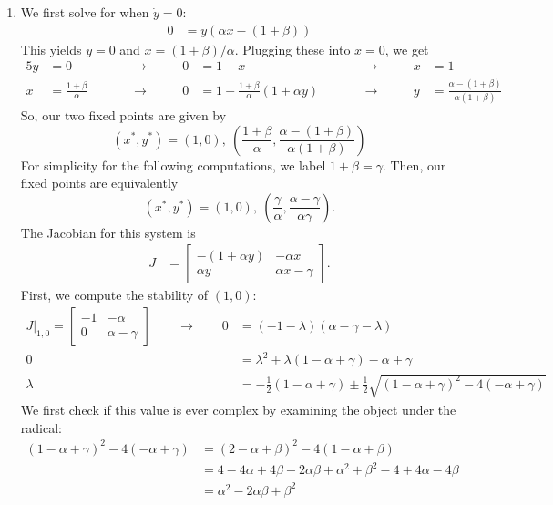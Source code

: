 \documentclass[10pt,letterpaper]{report}
\newcommand{\so}{\qquad \rightarrow \qquad}
\newcommand{\mtx}[2]{\left[\begin{array}{#1}#2\end{array}\right]}
\begin{document}
\begin{enumerate}
\begin{enumerate}
    \item We first solve for when $\dot y = 0:$
    \begin{align*}
        0 &= y\left(\alpha x - ( 1 + \beta) \right)
    \end{align*}
    This yields $y = 0$ and $x = (1 + \beta)/\alpha$. Plugging these into $\dot x = 0$, we get
    \begin{alignat*}{5}
        y &= 0 &\qquad &\rightarrow&\qquad 0 &= 1 - x &\qquad &\rightarrow&\qquad x &= 1 \\
        x &= \frac{1 + \beta}{\alpha} &\qquad &\rightarrow&\qquad 0 &= 1 - \frac{1 + \beta}{\alpha}\left(1 + \alpha y\right) &\qquad &\rightarrow&\qquad y &= \frac{\alpha - (1 + \beta)}{\alpha(1 + \beta)}
    \end{alignat*}
    So, our two fixed points are given by
    \[
    (x^*, y^*) = (1, 0),\ \left(\frac{1 + \beta}{\alpha},\frac{\alpha - (1 + \beta)}{\alpha(1 + \beta)} \right)
    \]
    For simplicity for the following computations, we label $1 + \beta = \gamma$. Then, our fixed points are equivalently 
    \[
    (x^*, y^*) = (1, 0),\ \left(\frac{\gamma}{\alpha},\frac{\alpha - \gamma}{\alpha\gamma} \right).
    \]
    The Jacobian for this system is
    \begin{align*}
        J &= \mtx{cc}{-(1+\alpha y) & -\alpha x \\ \alpha y & \alpha x - \gamma}.
    \end{align*}
    First, we compute the stability of $(1, 0):$
    \begin{align*}
        J\big\vert_{1,0} = \mtx{cc}{-1 & -\alpha \\ 0 & \alpha - \gamma}
        \so
        0 &= (-1-\lambda)(\alpha-\gamma-\lambda) \\
        0 &= \lambda^2 + \lambda(1 - \alpha + \gamma) - \alpha + \gamma \\
        \lambda &= -\frac{1}{2}\left(1 - \alpha + \gamma\right) \pm \frac{1}{2}\sqrt{(1 - \alpha + \gamma)^2 - 4(-\alpha + \gamma)}
    \end{align*}
    We first check if this value is ever complex by examining the object under the radical:
    \begin{align*}
        (1 - \alpha + \gamma)^2 - 4(-\alpha + \gamma) 
        &=
        (2 - \alpha + \beta)^2 - 4(1 -\alpha + \beta) \\
        &= 
        4 - 4\alpha + 4\beta - 2\alpha\beta + \alpha^2 + \beta^2 - 4 + 4\alpha - 4\beta
        \\
        &= \alpha^2 - 2\alpha\beta + \beta^2 \\

\end{align*}
\end{enumerate}
\end{enumerate}
\end{document}
